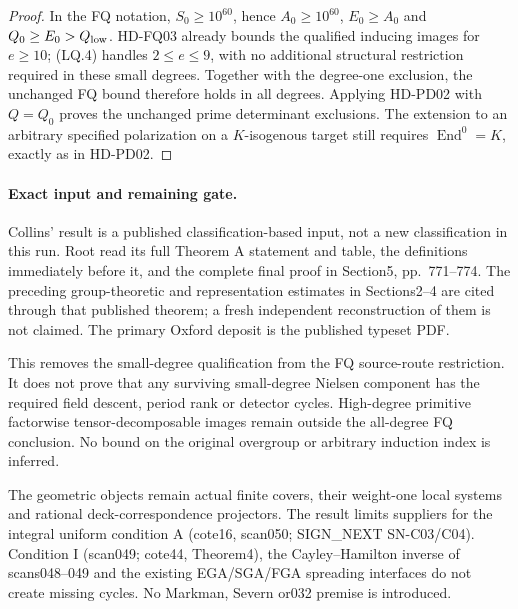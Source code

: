 \begin{proof}
In the FQ notation, \(S_0\ge10^{60}\), hence
\(A_0\ge10^{60}\), \(E_0\ge A_0\) and
\(Q_0\ge E_0>Q_{\rm low}\).
HD-FQ03 already bounds the qualified inducing images for
\(e\ge10\); (LQ.4) handles \(2\le e\le9\), with no additional
structural restriction required in these small degrees.
Together with the degree-one exclusion, the unchanged FQ bound
therefore holds in all degrees.
Applying HD-PD02 with \(Q=Q_0\) proves the unchanged prime
determinant exclusions. The extension to an arbitrary specified
polarization on a \(K\)-isogenous target still requires
\(\operatorname{End}^0=K\), exactly as in HD-PD02.
\end{proof}

\paragraph{Exact input and remaining gate.}
Collins' result is a published classification-based input, not a new
classification in this run. Root read its full Theorem A statement
and table, the definitions immediately before it, and the complete
final proof in Section5, pp.~771--774. The preceding group-theoretic
and representation estimates in Sections2--4 are cited through that
published theorem; a fresh independent reconstruction of them is not
claimed. The primary Oxford deposit is the published typeset PDF.

This removes the small-degree qualification from the FQ source-route
restriction. It does not prove that any surviving small-degree
Nielsen component has the required field descent, period rank or
detector cycles. High-degree primitive factorwise tensor-decomposable
images remain outside the all-degree FQ conclusion. No bound on the
original overgroup or arbitrary induction index is inferred.

The geometric objects remain actual finite covers, their weight-one
local systems and rational deck-correspondence projectors. The result
limits suppliers for the integral uniform condition A (cote16,
scan050; SIGN\_NEXT SN-C03/C04). Condition I (scan049; cote44,
Theorem4), the Cayley--Hamilton inverse of scans048--049 and the
existing EGA/SGA/FGA spreading interfaces do not create missing
cycles. No Markman, Severn or032 premise is introduced.
